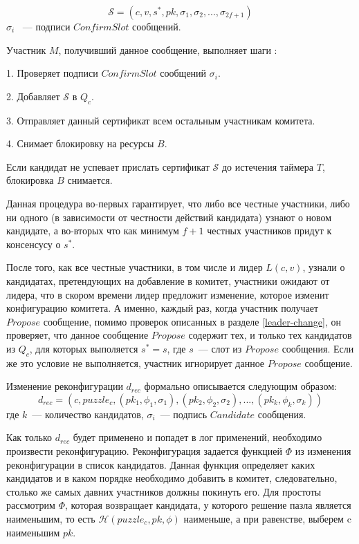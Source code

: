 $$\mathcal{S}=(c, v, s^{*}, pk, \sigma_1, \sigma_2,..., \sigma_{2f+1})$$
$\sigma_i$ ~--- подписи $ConfirmSlot$ сообщений.
\vspace{10pt}

Участник $M$, получивший данное сообщение, выполняет шаги : 

1. Проверяет подписи $ConfirmSlot$ сообщений $\sigma_i$.

2. Добавляет $\mathcal{S}$ в $Q_c$.

3. Отправляет данный сертификат всем остальным участникам комитета.

4. Снимает блокировку на ресурсы $B$.

Если кандидат не успевает прислать сертификат $\mathcal{S}$ до истечения таймера $T$, блокировка $B$ снимается.

Данная процедура во-первых гарантирует, что либо все честные участники, либо ни одного (в зависимости от честности действий кандидата) узнают о новом кандидате, а во-вторых что как минимум $f+1$ честных участников придут к консенсусу о $s^{*}$.

После того, как все честные участники, в том числе и лидер $L(c, v)$, узнали о кандидатах, претендующих на добавление в комитет, участники ожидают от лидера, что в скором времени лидер предложит изменение, которое изменит конфигурацию комитета. А именно, каждый раз, когда участник получает $Propose$ сообщение, помимо проверок описанных в  разделе \ref{leader-change}, он проверяет, что данное сообщение $Propose$ содержит тех, и только тех кандидатов из $Q_c$, для которых выполяется $s^{*} = s$, где $s$~--- слот из $Propose$ сообщения. Если же это условие не выполняется, участник игнорирует данное $Propose$ сообщение.

Изменение реконфигурации $d_{rec}$ формально описывается следующим образом:
$$d_{rec}=(c, puzzle_c, (pk_1, \phi_1, \sigma_1), (pk_2, \phi_2, \sigma_2),...,(pk_k, \phi_k, \sigma_k))$$
где $k$~--- количество кандидатов, $\sigma_i$~--- подпись $Candidate$ сообщения.

Как только $d_{rec}$ будет применено и попадет в лог применений, необходимо произвести реконфигурацию.
Реконфигурация задается функцией $\Phi$ из изменения реконфигурации в список кандидатов. Данная функция определяет каких кандидатов и в каком порядке необходимо добавить в комитет, следовательно, столько же самых давних участников должны покинуть его. Для простоты рассмотрим $\Phi$, которая возвращает кандидата, у которого решение пазла является наименьшим, то есть $\mathcal{H}(puzzle_c, pk, \phi)$ наименьше, а при равенстве, выберем c наименьшим $pk$.

